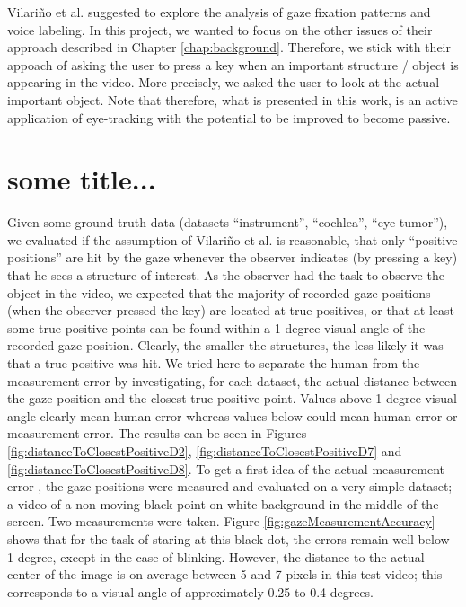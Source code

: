 Vilari\~no et al. suggested to explore the analysis of gaze fixation patterns and voice labeling. In this project, we wanted to focus on the other issues of their approach described in Chapter \ref{chap:background}. Therefore, we stick with their appoach of asking the user to press a key when an important structure / object is appearing in the video. More precisely, we asked the user to look at the actual important object. Note that therefore, what is presented in this work, is an active application of eye-tracking with the potential to be improved to become passive.

\section{some title...}
Given some ground truth data (datasets ``instrument'', ``cochlea'', ``eye tumor''), we evaluated if the assumption of Vilari\~no et al.  is reasonable, that only ``positive positions'' are hit by the gaze whenever the observer indicates (by pressing a key) that he sees a structure of interest. 
As the observer had the task to observe the object in the video, we expected that the majority of recorded gaze positions (when the observer pressed the key) are located at true positives, or that at least some true positive points can be found within a 1 degree visual angle of the recorded gaze position. 
Clearly, the smaller the structures, the less likely it was that a true positive was hit. 
We tried here to separate the human from the measurement error by investigating, for each dataset, the actual distance between the gaze position and the closest true positive point. 
Values above 1 degree visual angle clearly mean human error whereas values below could mean human error or measurement error. 
The results can be seen in Figures \ref{fig:distanceToClosestPositiveD2}, \ref{fig:distanceToClosestPositiveD7} and \ref{fig:distanceToClosestPositiveD8}. 
To get a first idea of the actual measurement error , the gaze positions were measured and evaluated on a very simple dataset; a video of a non-moving black point on white background in the middle of the screen. 
Two measurements were taken. Figure \ref{fig:gazeMeasurementAccuracy} shows that for the task of staring at this black dot, the errors remain well below 1 degree, except in the case of blinking. 
However, the distance to the actual center of the image is on average between 5 and 7 pixels in this test video; this corresponds to a visual angle of approximately 0.25 to 0.4 degrees.

